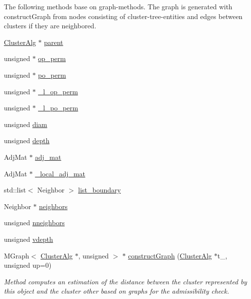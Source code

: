 \-The following methods base on graph-\/methods. \-The graph is generated with construct\-Graph from nodes consisting of cluster-\/tree-\/entities and edges between clusters if they are neighbored. \begin{DoxyCompactItemize}
\item 
\hyperlink{classClusterAlg}{\-Cluster\-Alg} $\ast$ \hyperlink{classClusterAlg_a1b63bc64e4622216b0539c4a5b76d3c2}{parent}
\item 
unsigned $\ast$ \hyperlink{classClusterAlg_a4f06e1465978072d8c6bd098e062b701}{op\-\_\-perm}
\item 
unsigned $\ast$ \hyperlink{classClusterAlg_af3d1d7c4ae0516ff9de725d3ff760b07}{po\-\_\-perm}
\item 
unsigned $\ast$ \hyperlink{classClusterAlg_a25fe84e1434812f52a484e14dc191a01}{\-\_\-l\-\_\-op\-\_\-perm}
\item 
unsigned $\ast$ \hyperlink{classClusterAlg_ae5aac25ca0791e244b25574814b18825}{\-\_\-l\-\_\-po\-\_\-perm}
\item 
unsigned \hyperlink{classClusterAlg_a38f91e914760de5e80a8023e5bb644bf}{diam}
\item 
unsigned \hyperlink{classClusterAlg_ac06ccb0ba85be10e97392bd063fa78c8}{depth}
\item 
\-Adj\-Mat $\ast$ \hyperlink{classClusterAlg_a29eb1ed447fe956fbece857e0ab898bc}{adj\-\_\-mat}
\item 
\-Adj\-Mat $\ast$ \hyperlink{classClusterAlg_aa7d43b82eac4084710cabafe6c9d8fee}{\-\_\-local\-\_\-adj\-\_\-mat}
\item 
std\-::list$<$ \-Neighbor $>$ \hyperlink{classClusterAlg_ace012e3a54a91c88fb486b7e02394d39}{list\-\_\-boundary}
\item 
\-Neighbor $\ast$ \hyperlink{classClusterAlg_a09156a9cf7570cde252131f25e599fbb}{neighbors}
\item 
unsigned \hyperlink{classClusterAlg_af1b22f77639a805d28569806d561600e}{nneighbors}
\item 
unsigned \hyperlink{classClusterAlg_ac1034ff983ce968e11edaf18c2b15cb2}{vdepth}
\item 
\-M\-Graph$<$ \hyperlink{classClusterAlg}{\-Cluster\-Alg} $\ast$, unsigned $>$ $\ast$ \hyperlink{classClusterAlg_ad3a53cf9fb7af4e2a45e7d859bc87c7b}{construct\-Graph} (\hyperlink{classClusterAlg}{\-Cluster\-Alg} $\ast$t\-\_, unsigned up=0)
\begin{DoxyCompactList}\small\item\em \-Method computes an estimation of the distance between the cluster represented by this object and the cluster other based on graphs for the admissibility check. \end{DoxyCompactList}\item 

\end{DoxyCompactItemize}
